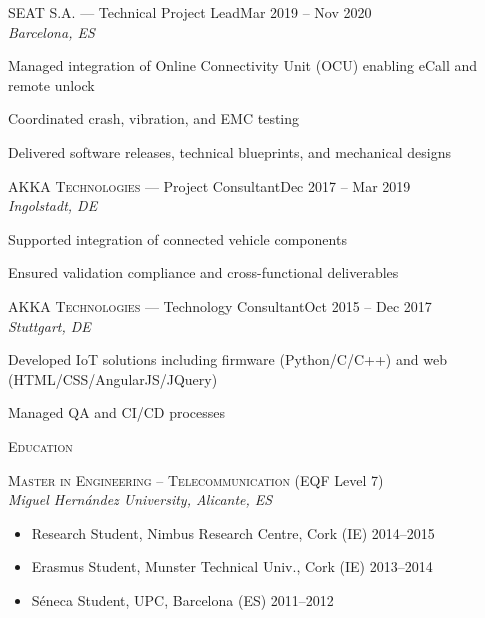 \documentclass[11pt, a4paper]{article}
\newcommand{\headright}[1]{\vspace*{2ex}\textsc{\large\color{cvblue}#1}\par%
  \vspace*{-1.4ex}{\color{cvblue}\hrulefill}\par}
\newlength{\SideBarW}
\newlength{\BetweenJobsGap}
\newlength{\RightColMargin}
\newenvironment{job}[4]{%
  \vspace{\BetweenJobsGap}%
  \noindent\textsc{\textcolor{cvblue}{#1}} {\color{darkgray}--- #2}\hfill {\small #3}\\%
  {\small\itshape #4}\par
  \begin{list}{--}{%
      \setlength{\leftmargin}{1.4em}%
      \setlength{\labelsep}{0.5em}%
      \setlength{\itemsep}{0.45ex}%
      \setlength{\topsep}{0.2ex}%
      \setlength{\rightmargin}{\RightColMargin}%
      \setlength{\listparindent}{0pt}%
      \setlength{\parsep}{0pt}%
    }%
}{\end{list}}
\begin{document}
\begin{minipage}[t][\textheight][t]{\textwidth}
\begin{minipage}[t]{\dimexpr\textwidth-\SideBarW-3mm\relax}
  \begin{job}{SEAT S.A.}{Technical Project Lead}{Mar 2019 -- Nov 2020}{Barcelona, ES}
    \item Managed integration of Online Connectivity Unit (OCU) enabling eCall and remote unlock
    \item Coordinated crash, vibration, and EMC testing
    \item Delivered software releases, technical blueprints, and mechanical designs
  \end{job}

  \begin{job}{AKKA Technologies}{Project Consultant}{Dec 2017 -- Mar 2019}{Ingolstadt, DE}
    \item Supported integration of connected vehicle components
    \item Ensured validation compliance and cross-functional deliverables
  \end{job}

  \begin{job}{AKKA Technologies}{Technology Consultant}{Oct 2015 -- Dec 2017}{Stuttgart, DE}
    \item Developed IoT solutions including firmware (Python/C/C++) and web (HTML/CSS/AngularJS/JQuery)
    \item Managed QA and CI/CD processes
  \end{job}

  \headright{Education}
  \noindent\textsc{Master in Engineering – Telecommunication} {\small (EQF Level 7)} \\
  \textit{Miguel Hernández University, Alicante, ES} \\[0.4ex]
  \begin{itemize}[leftmargin=1.4em,label=--,labelsep=0.5em,itemsep=0.3ex,topsep=0.2ex]
    \item Research Student, Nimbus Research Centre, Cork (IE) \hfill 2014--2015
    \item Erasmus Student, Munster Technical Univ., Cork (IE) \hfill 2013--2014
    \item Séneca Student, UPC, Barcelona (ES) \hfill 2011--2012
  \end{itemize}

\end{minipage}

\end{minipage} %
\end{document}
